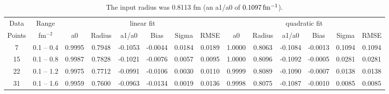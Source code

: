 \documentclass[10pt,aps,prc,twocolumn]{revtex4-1}
\begin{document}
\begin{table}
\label{fulltable}
\caption{The input radius was 0.8113 fm (an a1/a0 of $\unit[0.1097]{fm^{-1}}$).}
\begin{tabular}{cc|cccccc|cccccc} \hline
Data   & Range     & \multicolumn{6}{c|}{linear fit}                       & \multicolumn{6}{c}{quadratic fit}                    \\ 
Points & fm$^{-2}$ &   a0  & Radius&  a1/a0 &  Bias  & Sigma &  RMSE  &   a0  & Radius& a1/a0  &  Bias  & Sigma &  RMSE \\  \hline
7      & 0.1 -- 0.4 & 0.9995& 0.7948& -0.1053& -0.0044& 0.0184& 0.0189 & 1.0000& 0.8063& -0.1084& -0.0013& 0.1094& 0.1094\\
15     & 0.1 -- 0.8 & 0.9987& 0.7828& -0.1021& -0.0076& 0.0057& 0.0095 & 1.0000& 0.8096& -0.1092& -0.0005& 0.0281& 0.0281\\
22     & 0.1 -- 1.2 & 0.9975& 0.7712& -0.0991& -0.0106& 0.0030& 0.0110 & 0.9999& 0.8089& -0.1090& -0.0007& 0.0138& 0.0138\\
31     & 0.1 -- 1.6 & 0.9959& 0.7600& -0.0963& -0.0134& 0.0019& 0.0136 & 0.9998& 0.8075& -0.1087& -0.0010& 0.0085& 0.0085\\ \hline
\end{tabular}
\end{table}
\end{document}
